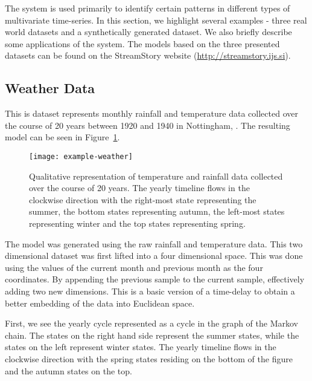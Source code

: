 The system is used primarily to identify certain patterns in different types of multivariate time-series. In this section, we highlight several examples -  three real world datasets and a synthetically generated dataset.  We also briefly describe some applications of the system.  The models based on the three presented datasets can be found on the StreamStory website (\url{http://streamstory.ijs.si}). 



\subsection{Weather Data}
\label{sec:experiments-weather}
This is dataset represents monthly rainfall and temperature data
collected over the course of 20 years between 1920 and 1940 in Nottingham, . 
The resulting model can be seen in Figure~\ref{fig:example-weather}. 

\begin{figure}[h!]
	\centering
	\texttt{[image: example-weather]}
	\caption{Qualitative representation of temperature and rainfall data collected over the course of 20 years. The yearly timeline flows in the clockwise direction with the right-most state representing the summer, the bottom states representing autumn, the left-most states representing winter and the top states representing spring.}
	\label{fig:example-weather}
\end{figure}

The model was generated using the raw rainfall and temperature data. This two dimensional dataset was first  lifted into a four dimensional space. This was done using the values of the current month and previous month as the four coordinates.
By appending the previous sample to the current sample, effectively adding two new dimensions. This is a basic version of a time-delay  to obtain a better embedding of the data into Euclidean space.

First, we see the yearly cycle represented as a cycle in the graph of the Markov chain. 
The states on the right hand side represent the 
summer states, while the states on the left represent winter states. The yearly timeline flows in the clockwise direction with the spring states residing on the bottom of the figure and the autumn
states on the top.


